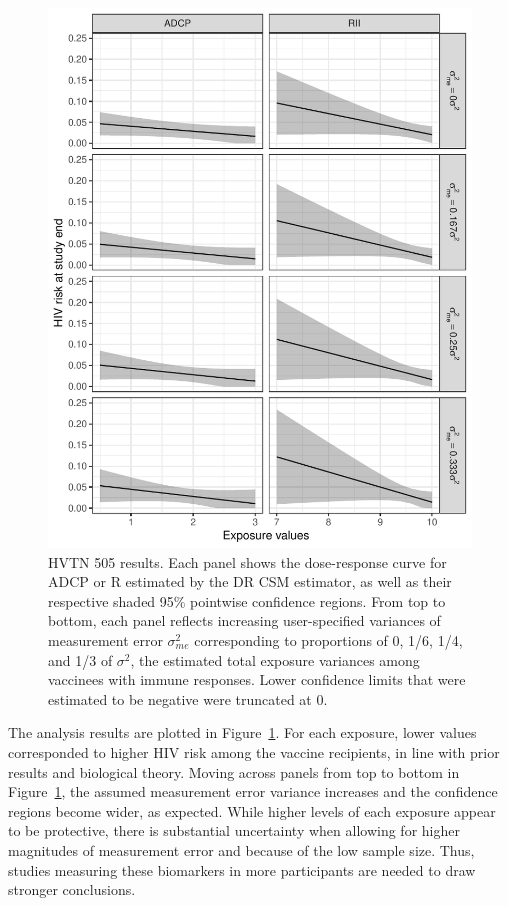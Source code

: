 \documentclass[useAMS,usenatbib,referee]{biom}
\newcommand{\RNum}[1]{\uppercase\expandafter{\romannumeral #1\relax}}
\begin{document}
\begin{figure}[h!]
\centering
\includegraphics[width=5.6in]{fig3-linear2.pdf}
\caption{HVTN 505 results. Each panel shows the dose-response curve for ADCP or R\RNum{2} estimated by the DR CSM estimator, as well as their respective shaded 95\% pointwise confidence regions. From top to bottom, each panel reflects increasing user-specified variances of measurement error $\sigma^{2}_{me}$ corresponding to proportions of 0, 1/6, 1/4, and 1/3 of $\sigma^{2}$, the estimated total exposure variances among vaccinees with immune responses. Lower confidence limits that were estimated to be negative were truncated at 0.}
\label{fig:three}
\end{figure}

The analysis results are plotted in Figure~\ref{fig:three}. For each exposure, lower values corresponded to higher HIV risk among the vaccine recipients, in line with prior results and biological theory. Moving across panels from top to bottom in Figure~\ref{fig:three}, the assumed measurement error variance increases and the confidence regions become wider, as expected. While higher levels of each exposure appear to be protective, there is substantial uncertainty when allowing for higher magnitudes of measurement error and because of the low sample size. Thus, studies measuring these biomarkers in more participants are needed to draw stronger conclusions.
\end{document}
